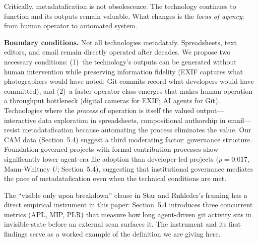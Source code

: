 \documentclass[12pt]{article}
\begin{document}
Critically, metadatafication is not obsolescence. The technology continues to function and its outputs remain valuable. What changes is the \textit{locus of agency}: from human operator to automated system.

\textbf{Boundary conditions.} Not all technologies metadatafy. Spreadsheets, text editors, and email remain directly operated after decades. We propose two necessary conditions: (1)~the technology's outputs can be generated without human intervention while preserving information fidelity (EXIF captures what photographers would have noted; Git commits record what developers would have committed), and (2)~a faster operator class emerges that makes human operation a throughput bottleneck (digital cameras for EXIF; AI agents for Git). Technologies where the \textit{process} of operation is itself the valued output---interactive data exploration in spreadsheets, compositional authorship in email---resist metadatafication because automating the process eliminates the value. Our CAM data (Section~5.4) suggest a third moderating factor: governance structure. Foundation-governed projects with formal contribution processes show significantly lower agent-era file adoption than developer-led projects ($p=0.017$, Mann-Whitney $U$; Section~5.4), suggesting that institutional governance mediates the pace of metadatafication even when the technical conditions are met.

The ``visible only upon breakdown'' clause in Star and Ruhleder's framing has a direct empirical instrument in this paper: Section~5.4 introduces three concurrent metrics (APL, MIP, PLR) that measure how long agent-driven git activity sits in invisible-state before an external scan surfaces it. The instrument and its first findings serve as a worked example of the definition we are giving here.
\end{document}

